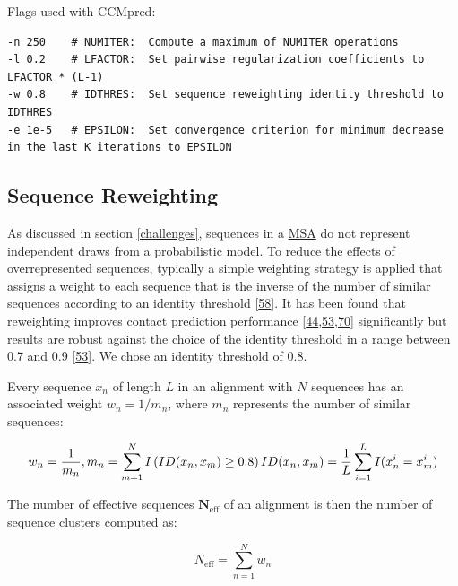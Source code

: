 \documentclass[12pt,a4paper,twoside]{book}
\newcommand{\neff}{N_\mathrm{eff}}
\theoremstyle{definition}
\theoremstyle{definition}
\theoremstyle{remark}
\begin{document}
Flags used with CCMpred:

\begin{verbatim}
-n 250    # NUMITER:  Compute a maximum of NUMITER operations
-l 0.2    # LFACTOR:  Set pairwise regularization coefficients to LFACTOR * (L-1) 
-w 0.8    # IDTHRES:  Set sequence reweighting identity threshold to IDTHRES
-e 1e-5   # EPSILON:  Set convergence criterion for minimum decrease in the last K iterations to EPSILON
\end{verbatim}

\subsection{Sequence Reweighting}\label{seq-reweighting}

As discussed in section \ref{challenges}, sequences in a
\protect\hyperlink{abbrev}{MSA} do not represent independent draws from
a probabilistic model. To reduce the effects of overrepresented
sequences, typically a simple weighting strategy is applied that assigns
a weight to each sequence that is the inverse of the number of similar
sequences according to an identity threshold
{[}\protect\hyperlink{ref-Stein2015a}{58}{]}. It has been found that
reweighting improves contact prediction performance
{[}\protect\hyperlink{ref-Jones2012}{44},\protect\hyperlink{ref-Morcos2011}{53},\protect\hyperlink{ref-Buslje2009}{70}{]}
significantly but results are robust against the choice of the identity
threshold in a range between 0.7 and 0.9
{[}\protect\hyperlink{ref-Morcos2011}{53}{]}. We chose an identity
threshold of 0.8.

Every sequence \(x_n\) of length \(L\) in an alignment with \(N\)
sequences has an associated weight \(w_n = 1/m_n\), where \(m_n\)
represents the number of similar sequences:

\begin{equation} 
  w_n = \frac{1}{m_n}, m_n = \sum_{m=1}^N I \left( ID(x_n, x_m) \geq 0.8 \right) \\
  ID(x_n, x_m)=\frac{1}{L} \sum_{i=1}^L I(x_n^i = x_m^i)
  \label{eq:seqweight}
\end{equation}

The number of effective sequences \(\mathbf{\neff}\) of an alignment is
then the number of sequence clusters computed as:

\begin{equation} 
  \neff = \sum_{n=1}^N w_n
  \label{eq:neff}
\end{equation}
\end{document}

